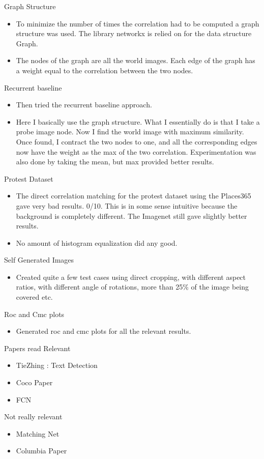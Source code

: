 \documentclass{article}
\begin{document}
Graph Structure
\begin{itemize}
\item To minimize the number of times the correlation had to be computed a graph structure was used. The library networkx is relied on for the data structure Graph.
\item The nodes of the graph are all the world images. Each edge of the graph has a weight equal to the correlation between the two nodes.
\end{itemize}

Recurrent baseline
\begin{itemize}
\item Then tried the recurrent baseline approach.
\item Here I  basically use the graph structure. What I essentially do is that I take a probe image node. Now I find the world image with maximum similarity. Once found, I contract the two nodes to one, and all the corresponding edges now have the weight as the max of the two correlation. Experimentation was also done by taking the mean, but max provided better results.
\end{itemize}

Protest Dataset
\begin{itemize}
\item The direct correlation matching for the protest dataset using the Places365 gave very bad results. 0/10. This is in some sense intuitive because the background is completely different. The Imagenet still gave slightly better results.
\item No amount of histogram equalization did any good.
\end{itemize}

Self Generated Images
\begin{itemize}
\item Created quite a few test cases using direct cropping, with different aspect ratios, with different angle of rotations, more than 25\% of the image being covered etc.
\end{itemize}

Roc and Cmc plots
\begin{itemize}
\item Generated roc and cmc plots for all the relevant results.
\end{itemize}

Papers read
Relevant
\begin{itemize}
\item TieZhing : Text Detection
\item Coco Paper
\item FCN
\end{itemize}
Not really relevant
\begin{itemize}
\item Matching Net
\item Columbia Paper
\end{itemize}
\end{document}

